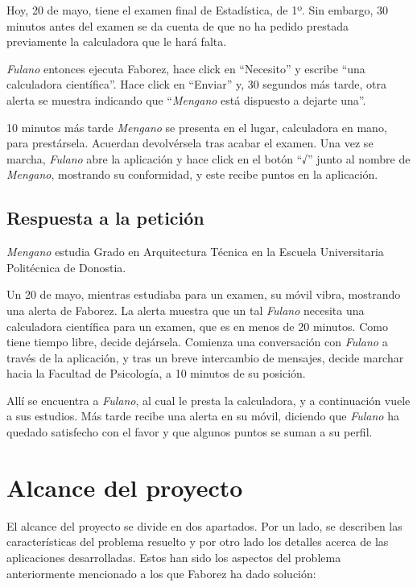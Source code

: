 \documentclass[main]{subfiles}
\begin{document}
Hoy, 20 de mayo, tiene el examen final de Estadística, de 1º. Sin embargo, 30 minutos antes del examen se da cuenta de que no ha pedido prestada previamente la calculadora que le hará falta.

\emph{Fulano} entonces ejecuta Faborez, hace click en \enquote{Necesito} y escribe \enquote{una calculadora científica}. Hace click en \enquote{Enviar} y, 30 segundos más tarde, otra alerta se muestra indicando que \enquote{\emph{Mengano} está dispuesto a dejarte una}.

10 minutos más tarde \emph{Mengano} se presenta en el lugar, calculadora en mano, para prestársela. Acuerdan devolvérsela tras acabar el examen. Una vez se marcha, \emph{Fulano} abre la aplicación y hace click en el botón \enquote{√} junto al nombre de \emph{Mengano}, mostrando su conformidad, y este recibe puntos en la aplicación.

\subsection{Respuesta a la petición}
\emph{Mengano} estudia Grado en Arquitectura Técnica en la Escuela Universitaria Politécnica de Donostia.

Un 20 de mayo, mientras estudiaba para un examen, su móvil vibra, mostrando una alerta de Faborez. La alerta muestra que un tal \emph{Fulano} necesita una calculadora científica para un examen, que es en menos de 20 minutos. Como tiene tiempo libre, decide dejársela. Comienza una conversación con \emph{Fulano} a través de la aplicación, y tras un breve intercambio de mensajes, decide marchar hacia la Facultad de Psicología, a 10 minutos de su posición.

Allí se encuentra a \emph{Fulano}, al cual le presta la calculadora, y a continuación vuele a sus estudios. Más tarde recibe una alerta en su móvil, diciendo que \emph{Fulano} ha quedado satisfecho con el favor y que algunos puntos se suman a su perfil.


\section{Alcance del proyecto}

El alcance del proyecto se divide en dos apartados. Por un lado, se describen las características del problema resuelto y por otro lado los detalles acerca de las aplicaciones desarrolladas. Estos han sido los aspectos del problema anteriormente mencionado a los que Faborez ha dado solución:
\end{document}
